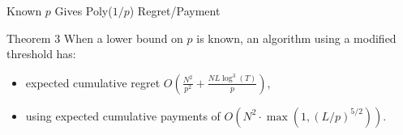 \documentclass[serif]{beamer}
\begin{document}
\begin{frame}{\large{Known $p$ Gives Poly($1/p$) Regret/Payment}}
\begin{block}{Theorem 3}
When a lower bound on $p$ is known, an algorithm using a modified threshold has:
\begin{itemize}[label=\textbullet]
\item expected cumulative regret $O(\frac{N^2}{p^2} + \frac{N L \log^3(T)}{p})$,
\item using expected cumulative payments of $O(N^2\cdot \max(1,(L/p)^{5/2}))$.
\end{itemize}
\end{block}

\end{frame}






%
%




\end{document}
